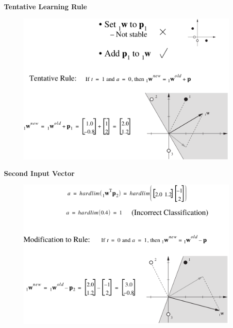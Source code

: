 \documentclass[10pt, compress]{beamer}
\begin{document}
\begin{frame}
  \vspace{1cm}
  \textbf{Tentative Learning Rule}
  \begin{figure}
    \includegraphics[width=.9\linewidth]{imgs/perceptron_ex_3}
  \end{figure}
\end{frame}

\begin{frame}
  \vspace{1cm}
  \textbf{Second Input Vector}
  \begin{figure}
    \includegraphics[width=.9\linewidth]{imgs/perceptron_ex_4}
  \end{figure}
\end{frame}
\end{document}
